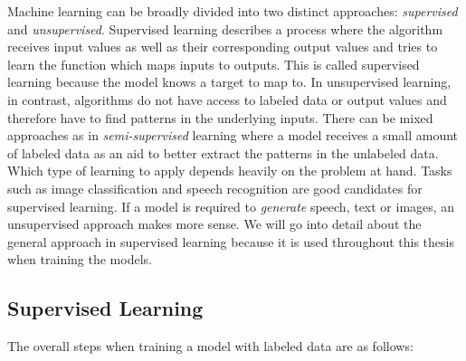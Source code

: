 \documentclass[draft,final]{vutinfth} %
\begin{document}
Machine learning can be broadly divided into two distinct approaches:
\emph{supervised} and \emph{unsupervised}. Supervised learning
describes a process where the algorithm receives input values as well
as their corresponding output values and tries to learn the function
which maps inputs to outputs. This is called supervised learning
because the model knows a target to map to. In unsupervised learning,
in contrast, algorithms do not have access to labeled data or output
values and therefore have to find patterns in the underlying
inputs. There can be mixed approaches as in \emph{semi-supervised}
learning where a model receives a small amount of labeled data as an
aid to better extract the patterns in the unlabeled data. Which type
of learning to apply depends heavily on the problem at hand. Tasks
such as image classification and speech recognition are good
candidates for supervised learning. If a model is required to
\emph{generate} speech, text or images, an unsupervised approach makes
more sense. We will go into detail about the general approach in
supervised learning because it is used throughout this thesis when
training the models.

\subsection{Supervised Learning}
\label{ssec:theory-sl}

The overall steps when training a model with labeled data are as
follows:
\end{document}
